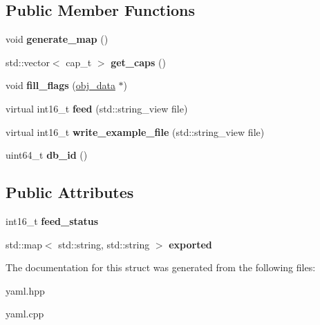 \subsection*{Public Member Functions}
\begin{DoxyCompactItemize}
\item 
\mbox{\label{structmods_1_1yaml_1_1trap__description__t_a3bb8125f45aa55bd5f2bf5d710741a81}} 
void {\bfseries generate\+\_\+map} ()
\item 
\mbox{\label{structmods_1_1yaml_1_1trap__description__t_ac6a6a9d23b09f9317be81114b1c1e989}} 
std\+::vector$<$ cap\+\_\+t $>$ {\bfseries get\+\_\+caps} ()
\item 
\mbox{\label{structmods_1_1yaml_1_1trap__description__t_adef7f74367b4b9a20ecc4696f48a0af2}} 
void {\bfseries fill\+\_\+flags} (\hyperlink{structobj__data}{obj\+\_\+data} $\ast$)
\item 
\mbox{\label{structmods_1_1yaml_1_1trap__description__t_abde04c74b54ca6b4e0869fd92ffea8c4}} 
virtual int16\+\_\+t {\bfseries feed} (std\+::string\+\_\+view file)
\item 
\mbox{\label{structmods_1_1yaml_1_1trap__description__t_a0ee496f2c71dbf5ec9cc570892a9fbf1}} 
virtual int16\+\_\+t {\bfseries write\+\_\+example\+\_\+file} (std\+::string\+\_\+view file)
\item 
\mbox{\label{structmods_1_1yaml_1_1trap__description__t_a5b36e346cee004543ca972fba41f5624}} 
uint64\+\_\+t {\bfseries db\+\_\+id} ()
\end{DoxyCompactItemize}
\subsection*{Public Attributes}
\begin{DoxyCompactItemize}
\item 
\mbox{\label{structmods_1_1yaml_1_1trap__description__t_a9dd29d76dd19b4820b539265b4e568d0}} 
int16\+\_\+t {\bfseries feed\+\_\+status}
\item 
\mbox{\label{structmods_1_1yaml_1_1trap__description__t_a9d0f4b9030d7bea496e94343ad76dca7}} 
std\+::map$<$ std\+::string, std\+::string $>$ {\bfseries exported}
\end{DoxyCompactItemize}


The documentation for this struct was generated from the following files\+:\begin{DoxyCompactItemize}
\item 
yaml.\+hpp\item 
yaml.\+cpp\end{DoxyCompactItemize}

